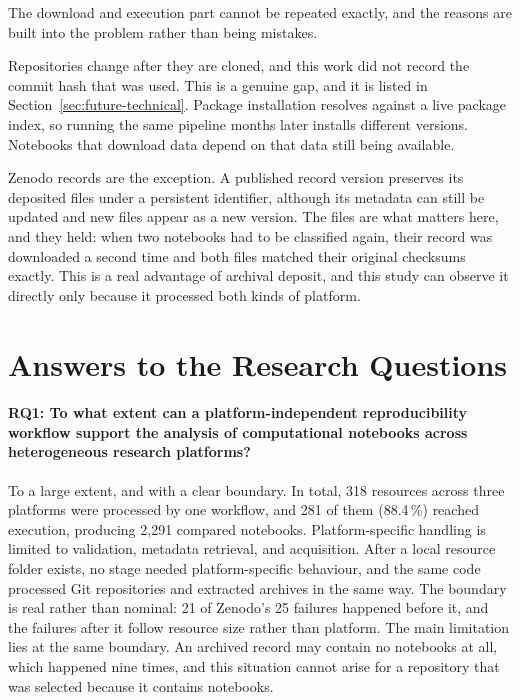 The download and execution part cannot be repeated exactly, and the reasons are built into the problem rather than being mistakes.

Repositories change after they are cloned, and this work did not record the commit hash that was used. This is a genuine gap, and it is listed in Section~\ref{sec:future-technical}. Package installation resolves against a live package index, so running the same pipeline months later installs different versions. Notebooks that download data depend on that data still being available.

Zenodo records are the exception. A published record version preserves its deposited files under a persistent identifier, although its metadata can still be updated and new files appear as a new version. The files are what matters here, and they held: when two notebooks had to be classified again, their record was downloaded a second time and both files matched their original checksums exactly. This is a real advantage of archival deposit, and this study can observe it directly only because it processed both kinds of platform.

\section{Answers to the Research Questions}
\label{sec:rq-answers}

\paragraph{RQ1: To what extent can a platform-independent reproducibility workflow support the analysis of computational notebooks across heterogeneous research platforms?}
To a large extent, and with a clear boundary. In total, 318 resources across three platforms were processed by one workflow, and 281 of them (88.4\,\%) reached execution, producing 2{,}291 compared notebooks. Platform-specific handling is limited to validation, metadata retrieval, and acquisition. After a local resource folder exists, no stage needed platform-specific behaviour, and the same code processed Git repositories and extracted archives in the same way. The boundary is real rather than nominal: 21 of Zenodo's 25 failures happened before it, and the failures after it follow resource size rather than platform. The main limitation lies at the same boundary. An archived record may contain no notebooks at all, which happened nine times, and this situation cannot arise for a repository that was selected because it contains notebooks.

